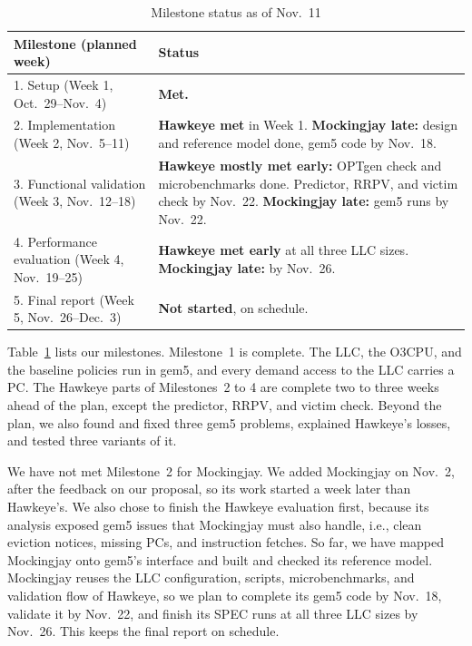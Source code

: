 \documentclass[10pt,journal,compsoc]{IEEEtran}
\begin{document}
\begin{table}[t]
\centering
\caption{Milestone status as of Nov.~11}
\label{tab:milestones}
\setlength{\tabcolsep}{3pt}
\begin{tabular}{@{}>{\raggedright}p{}>{\raggedright\arraybackslash}p{}@{}}
\toprule
Milestone (planned week) & Status \\
\midrule
1. Setup (Week 1, Oct.~29--Nov.~4) & \textbf{Met.} \\
2. Implementation (Week 2, Nov.~5--11) & \textbf{Hawkeye met} in Week 1. \textbf{Mockingjay late:} design and reference model done, gem5 code by Nov.~18. \\
3. Functional validation (Week 3, Nov.~12--18) & \textbf{Hawkeye mostly met early:} OPTgen check and microbenchmarks done. Predictor, RRPV, and victim check by Nov.~22. \textbf{Mockingjay late:} gem5 runs by Nov.~22. \\
4. Performance evaluation (Week 4, Nov.~19--25) & \textbf{Hawkeye met early} at all three LLC sizes. \textbf{Mockingjay late:} by Nov.~26. \\
5. Final report (Week 5, Nov.~26--Dec.~3) & \textbf{Not started}, on schedule. \\
\bottomrule
\end{tabular}
\end{table}

Table~\ref{tab:milestones} lists our milestones. Milestone~1 is complete. The
LLC, the O3CPU, and the baseline policies run in gem5, and every demand access
to the LLC carries a PC. The Hawkeye parts of Milestones~2 to 4 are complete two to three
weeks ahead of the plan, except the predictor, RRPV, and victim check. Beyond the plan, we also found and fixed three gem5
problems, explained Hawkeye's losses, and tested three variants of it.

We have not met Milestone~2 for Mockingjay. We added Mockingjay on Nov.~2,
after the feedback on our proposal, so its work started a week later than
Hawkeye's. We also chose to finish the Hawkeye evaluation first, because its
analysis exposed gem5 issues that Mockingjay must also handle, i.e., clean
eviction notices, missing PCs, and instruction fetches. So far, we have mapped
Mockingjay onto gem5's interface and built and checked its reference model.
Mockingjay reuses the LLC configuration, scripts, microbenchmarks, and
validation flow of Hawkeye, so we plan to complete its gem5 code by Nov.~18,
validate it by Nov.~22, and finish its SPEC runs at all three LLC sizes by
Nov.~26. This keeps the final report on schedule.
\end{document}
